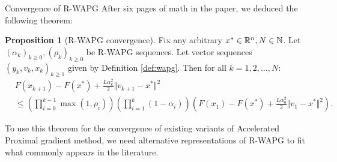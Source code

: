 \documentclass[11pt]{beamer}
\theoremstyle{definition}
\newtheorem{proposition}{Proposition}[section]
\begin{document}
    \begin{frame}{Convergence of R-WAPG}
        After six pages of math in the paper, we deduced the following theorem: 
        \begin{proposition}[R-WAPG convergence]\label{prop:wapg-convergence}
            Fix any arbitrary $x^* \in \mathbb R^n, N \in \mathbb N$.
            Let $(\alpha_k)_{k \ge 0}, (\rho_k)_{k \ge 0}$ be R-WAPG sequences.
            Let vector sequences $(y_k, v_{k}, x_{k})_{k \ge 1}$ given by Definition \ref{def:wapg}. 
            Then for all $k = 1, 2, \ldots, N$:
            {\small
            \begin{align*}
                & F(x_{k + 1}) - F(x^*) + \frac{L \alpha_k^2}{2}\Vert v_{k + 1} - x^*\Vert^2
                \\
                &\le
                \left(
                    \prod_{i = 0}^{k - 1} \max(1, \rho_{i})
                \right)
                \left(
                    \prod_{i = 1}^{k} \left(1  - \alpha_i\right)
                \right)
                \left(
                    F(x_1) - F(x^*) + \frac{L\alpha_0^2}{2}\Vert v_1 - x^*\Vert^2
                \right).
            \end{align*}
            }
        \end{proposition}
        To use this theorem for the convergence of existing variants of Accelerated Proximal gradient method, we need alternative representations of R-WAPG to fit what commonly appears in the literature. 
    \end{frame}
\end{document}
